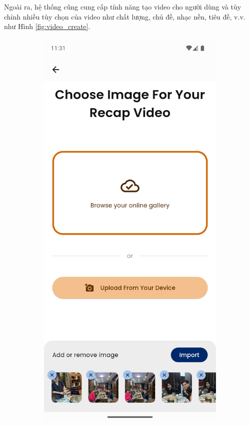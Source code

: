 Ngoài ra, hệ thống cũng cung cấp tính năng tạo video cho người dùng và tùy chỉnh nhiều tùy chọn của video như chất lượng, chủ đề, nhạc nền, tiêu đề, v.v. như Hình \ref{fig:video_create}.

\begin{figure}[H]
    \centering
    \begin{subfigure}{0.48\textwidth}
        \includegraphics[width=1\linewidth]{figures/c4/4-2/create_video_1.png} 

\end{subfigure}
\end{figure}
